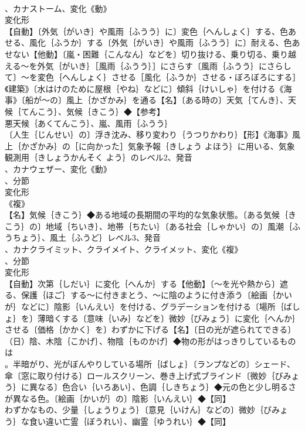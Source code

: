 \documentclass[8pt]{extreport}
\begin{document}
\begin{CJK}{UTF8}{min}
\\	、カナストーム、変化《動》
\\	変化形 
\\	【自動】〔外気｛がいき｝や風雨｛ふうう｝に〕変色｛へんしょく｝する、色あせる、風化｛ふうか｝する〔外気｛がいき｝や風雨｛ふうう｝に〕耐える、色あせない【他動】〔嵐・困難｛こんなん｝などを〕切り抜ける、乗り切る、乗り越える～を外気｛がいき｝［風雨｛ふうう｝］にさらす〔風雨｛ふうう｝にさらして〕～を変色｛へんしょく｝させる［風化｛ふうか｝させる・ぼろぼろにする］《建築》〔水はけのために屋根｛やね｝などに〕傾斜｛けいしゃ｝を付ける《海事》〔船が～の〕風上｛かざかみ｝を通る【名】〔ある時の〕天気｛てんき｝、天候｛てんこう｝、気候｛きこう｝◆【参考】
\\	悪天候｛あくてんこう｝、嵐、風雨｛ふうう｝
\\	〔人生｛じんせい｝の〕浮き沈み、移り変わり｛うつりかわり｝【形】《海事》風上｛かざかみ｝の［に向かった］気象予報｛きしょう よほう｝に用いる、気象観測用｛きしょうかんそく よう｝のレベル2、発音
\\	、カナウェザー、変化《動》
\\	、分節
\\	変化形 
\\	《複》
\\	【名】気候｛きこう｝◆ある地域の長期間の平均的な気象状態。〔ある気候｛きこう｝の〕地域｛ちいき｝、地帯｛ちたい｝〔ある社会｛しゃかい｝の〕風潮｛ふうちょう｝、風土｛ふうど｝レベル3、発音
\\	、カナクライミット、クライメイト、クライメット、変化《複》
\\	、分節
\\	変化形 
\\	【自動】次第｛しだい｝に変化｛へんか｝する【他動】〔～を光や熱から〕遮る、保護｛ほご｝する～に付きまとう、～に陰のように付き添う〔絵画｛かいが｝などに〕陰影｛いんえい｝を付ける、グラデーションを付ける〔場所｛ばしょ｝を〕薄暗くする〔意味｛いみ｝などを〕微妙｛びみょう｝に変化｛へんか｝させる〔価格｛かかく｝を〕わずかに下げる【名】〔日の光が遮られてできる〕（日）陰、木陰｛こかげ｝、物陰｛ものかげ｝◆物の形がはっきりしているものは
\\	。半暗がり、光がぼんやりしている場所｛ばしょ｝〔ランプなどの〕シェード、傘〔窓に取り付ける〕ロールスクリーン、巻き上げ式ブラインド〔微妙｛びみょう｝に異なる〕色合い｛いろあい｝、色調｛しきちょう｝◆元の色と少し明るさが異なる色。〔絵画｛かいが｝の〕陰影｛いんえい｝◆【同】
\\	わずかなもの、少量｛しょうりょう｝〔意見｛いけん｝などの〕微妙｛びみょう｝な食い違い亡霊｛ぼうれい｝、幽霊｛ゆうれい｝◆【同】

\end{CJK}
\end{document}
